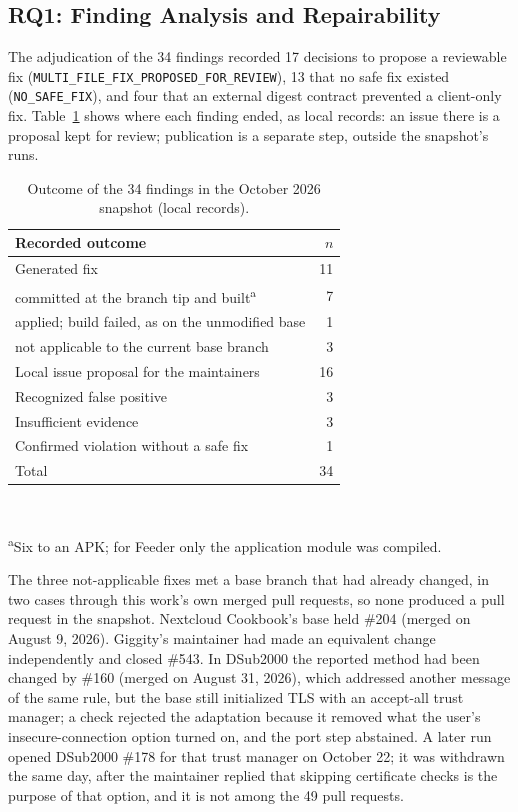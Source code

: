 \documentclass[conference]{IEEEtran}
\newcommand{\researchq}[1]{\textbf{RQ#1}}
\begin{document}
\subsection{\researchq{1}: Finding Analysis and Repairability}
\label{subsec:rq1}

The adjudication of the 34 findings recorded 17 decisions to propose a
reviewable fix (\texttt{MULTI\_FILE\_FIX\_PROPOSED\_FOR\_REVIEW}), 13 that no
safe fix existed (\texttt{NO\_SAFE\_FIX}), and four that an external digest
contract prevented a client-only fix. Table~\ref{tab:adjudication} shows
where each finding ended, as local records: an issue there is a proposal kept
for review; publication is a separate step, outside the snapshot's runs.

\begin{table}[H]
\centering
\caption{Outcome of the 34 findings in the October 2026 snapshot (local
records).}
\label{tab:adjudication}
\footnotesize
\begin{tabular}{p{6.1cm}r}
\toprule
Recorded outcome & $n$ \\
\midrule
Generated fix & 11 \\
\quad committed at the branch tip and built\textsuperscript{a} & 7 \\
\quad applied; build failed, as on the unmodified base & 1 \\
\quad not applicable to the current base branch & 3 \\
Local issue proposal for the maintainers & 16 \\
Recognized false positive & 3 \\
Insufficient evidence & 3 \\
Confirmed violation without a safe fix & 1 \\
\midrule
Total & 34 \\
\bottomrule
\end{tabular}
\\[2pt]\raggedright\scriptsize\textsuperscript{a}Six to an APK; for Feeder only
the application module was compiled.
\end{table}

The three not-applicable fixes met a base branch that had already changed, in
two cases through this work's own merged pull requests, so none produced a pull
request in the snapshot. Nextcloud Cookbook's base held \#204 (merged on August
9, 2026). Giggity's maintainer had made an equivalent change independently and
closed \#543. In DSub2000 the reported method had been changed by \#160 (merged
on August 31, 2026), which addressed another message of the same rule, but the
base still initialized TLS with an accept-all trust manager; a check rejected
the adaptation because it removed what the user's insecure-connection option
turned on, and the port step abstained. A later run opened DSub2000 \#178 for
that trust manager on October 22; it was withdrawn the same day, after the
maintainer replied that skipping certificate checks is the purpose of that
option, and it is not among the 49 pull requests.
\end{document}
